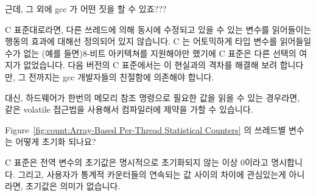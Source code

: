 \begin{enumerate}
\QuickQ{}
	근데, 그 외에 gcc 가 어떤 짓을 할 수 있죠???

\QuickA{}
	C 표준대로라면, 다른 쓰레드에 의해 동시에 수정되고 있을 수 있는 변수를
	읽어들이는 행동의 효과에 대해선 정의되어 있지 않습니다.
	C 는 어토믹하게  타입 변수를 읽어들일 수가 없는 (예를
	들면)8-비트 아키텍쳐를 지원해야만 했기에 C 표준은 다른 선택의 여지가
	없었습니다.
	다음 버전의 C 표준에서는 이 현실과의 격차를 해결해 보려 합니다만, 그
	전까지는 gcc 개발자들의 친절함에 의존해야 합니다.

	대신, 하드웨어가 한번의 메모리 참조 명령으로 필요한 값을 읽을 수 있는
	경우라면, ~\cite{JonCorbet2012ACCESS:ONCE} 같은
	volatile 접근법을 사용해서 컴파일러에 제약을 가할 수 있습니다.

\QuickQ{}
	Figure~\ref{fig:count:Array-Based Per-Thread Statistical Counters} 의
	쓰레드별  변수는 어떻게 초기화 되나요?

\QuickA{}
	C 표준은 전역 변수의 초기값은 명시적으로 초기화되지 않는 이상 0이라고
	명시합니다.
	그리고, 사용자가 통계적 카운터들의 연속되는 값 사이의 차이에
	관심있는게 아니라면, 초기값은 의미가 없습니다.

\end{enumerate}
